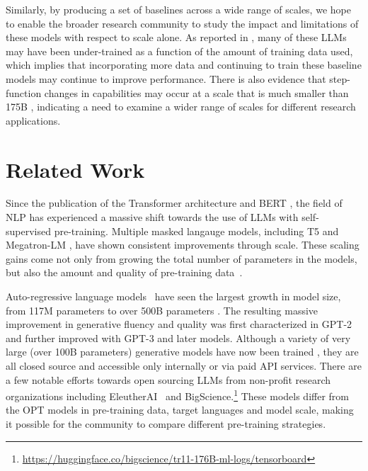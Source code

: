 \documentclass[11pt]{article}
\newcommand{\biggpt}[1]{{GPT-3#1}}
\begin{document}
Similarly, by producing a set of baselines across a wide range of scales, we hope to enable the broader research community to study the impact and limitations of these models with respect to scale alone. As reported in \citet{chinchilla2022}, many of these LLMs may have been under-trained as a function of the amount of training data used, which implies that incorporating more data and continuing to train these baseline models may continue to improve performance.  There is also evidence that step-function changes in capabilities may occur at a scale that is much smaller than 175B \cite{flan2021}, indicating a need to examine a wider range of scales for different research applications.

\section{Related Work}
\label{sec:related_work}

Since the publication of the Transformer architecture \cite{vaswani2017attention} and BERT \cite{devlin2018bert}, the field of NLP has experienced a massive shift towards the use of LLMs with self-supervised pre-training. 
Multiple masked langauge models, including T5 \cite{raffel2020exploring} and Megatron-LM \cite{shoeybi2019megatron}, have shown consistent improvements through scale. These scaling gains come not only from growing the total number of parameters in the models, but also the amount and quality of pre-training data~\cite{liu2019roberta,chinchilla2022}.  

Auto-regressive language models~\cite{mikolov2009neural} have seen the largest growth in model size, from 117M parameters \cite{radford2018gpt} to over 500B parameters \cite{megatron2022,palm2022}. The resulting massive improvement in generative fluency and quality was first characterized in GPT-2 \cite{radford2019language} and further improved with \biggpt{} \cite{brown2020gpt3} and later models. Although a variety of very large (over 100B parameters) generative models have now been trained \cite{J1WhitePaper,gopher2022,thoppilan2022lamda,megatron2022,palm2022}, they are all closed source and accessible only internally or via paid API services. There are a few notable efforts towards open sourcing LLMs from non-profit research organizations including EleutherAI~\cite{eleutherai2022} and BigScience.\footnote{\url{https://huggingface.co/bigscience/tr11-176B-ml-logs/tensorboard}} These models differ from the OPT models in pre-training data, target languages and model scale, making it possible for the community to compare different pre-training strategies.
\end{document}
